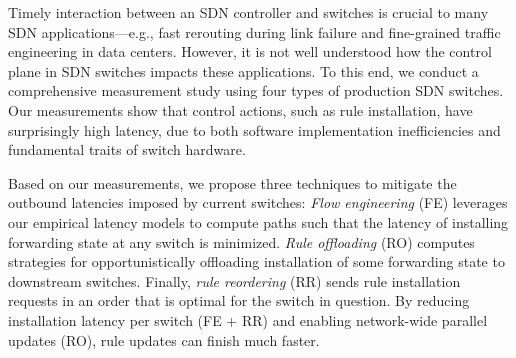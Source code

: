 
Timely interaction between an SDN controller and switches is crucial to many
SDN applications---e.g., fast rerouting during link failure and fine-grained
traffic engineering in data centers. However, it is not well understood how
the control plane in SDN switches impacts these applications. To this end, we
conduct a comprehensive measurement study using four
types of production SDN switches. Our measurements show that control actions,
such as rule installation, have surprisingly high latency, due to both
software implementation inefficiencies and fundamental traits of switch
hardware.

Based on our measurements, we propose three techniques to mitigate the outbound latencies
imposed by current switches:
{\em Flow engineering} (FE) leverages our empirical latency models to compute
paths such that the latency of installing forwarding state at any
switch is minimized.
{\em Rule
  offloading} (RO) computes strategies for opportunistically
offloading installation of some forwarding state to downstream switches.
Finally, {\em rule reordering} (RR) sends rule installation
requests in an order that is optimal for the switch in question. By reducing
installation latency per switch (FE + RR) and enabling network-wide parallel
updates (RO),
rule updates can finish much faster.
